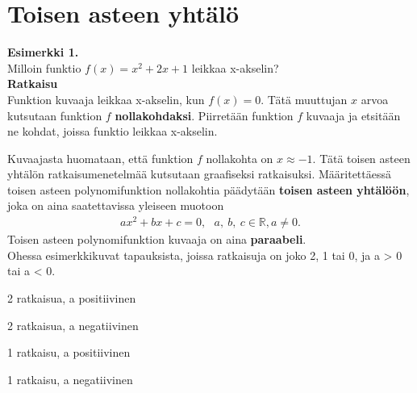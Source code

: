 \chapter{Toisen asteen yhtälö}
\textbf{Esimerkki 1.} \\
Milloin funktio $f(x)=x^2+2x+1$ leikkaa x-akselin? \\
\textbf{Ratkaisu} \\
Funktion kuvaaja leikkaa x-akselin, kun $f(x)=0$. Tätä muuttujan $x$ arvoa kutsutaan funktion $f$ \textbf{nollakohdaksi}. Piirretään funktion $f$ kuvaaja ja etsitään ne kohdat, joissa funktio leikkaa x-akselin. %

\begin{kuvaajapohja}{1.5}{-2.5}{0.5}{-0.5}{3}
\end{kuvaajapohja}

Kuvaajasta huomataan, että funktion $f$ nollakohta on $x \approx -1$. Tätä toisen asteen yhtälön ratkaisumenetelmää kutsutaan graafiseksi ratkaisuksi.
Määritettäessä toisen asteen polynomifunktion nollakohtia päädytään \textbf{toisen asteen yhtälöön}, joka on aina saatettavissa yleiseen muotoon
\begin{align*}
ax^2+bx+c=0, \ \ \ a, \ b, \ c  \in \mathbb{R}, a \neq 0.
\end{align*}
Toisen asteen polynomifunktion kuvaaja on aina \textbf{paraabeli}. \\

Ohessa esimerkkikuvat tapauksista, joissa ratkaisuja on joko 2, 1 tai 0,
ja a > 0 tai a < 0.

2 ratkaisua, a positiivinen

\begin{lukusuora}{-1}{1}{4}
\end{lukusuora}

2 ratkaisua, a negatiivinen

\begin{lukusuora}{-1}{1}{4}
\end{lukusuora}

1 ratkaisu, a positiivinen

\begin{lukusuora}{-2}{2}{4}
\end{lukusuora}

1 ratkaisu, a negatiivinen

\begin{lukusuora}{-2}{2}{4}
\end{lukusuora}

